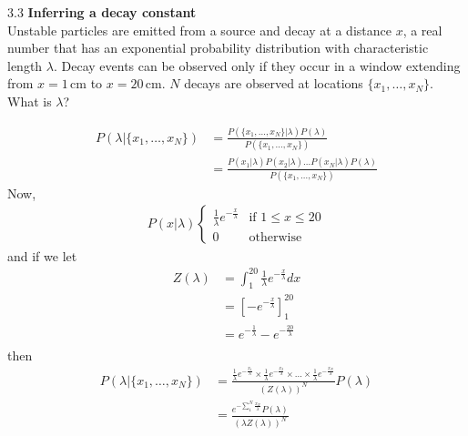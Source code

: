 \documentclass[12pt, a4paper]{article}
\begin{document}
\begin{prob}{3.3}
    \textbf{Inferring a decay constant} \\
Unstable particles are emitted from a source and decay at a distance $x$, a real number that has an exponential probability distribution with characteristic length $\lambda$. Decay events can be observed only if they occur in a window extending from $x = 1\,\text{cm}$ to $x = 20\,\text{cm}$. $N$ decays are observed at locations $\{x_1, \dots, x_N\}$. What is $\lambda$?
\end{prob}
\begin{sol}
    \begin{align*}
        P(\lambda | \{ x_1, \dots , x_N\}) &= \frac{P(\{ x_1, \dots , x_N\} | \lambda) P(\lambda)}{P(\{ x_1, \dots , x_N\})} \\
        &= \frac{P(x_1|\lambda)P(x_2|\lambda)\dots P(x_N|\lambda)P(\lambda)}{P(\{ x_1, \dots , x_N\})}
    \end{align*}
    Now, 
\begin{align*}
    P(x|\lambda)
\begin{cases} 
  \frac{1}{\lambda} e^{-\frac{x}{\lambda}} & \text{if } 1 \leq x \leq 20 \\
  0 & \text{otherwise}
\end{cases}
\end{align*}
and if we let 
\begin{align*}
    Z(\lambda) &= \int_{1}^{20} \frac{1}{\lambda} e^{-\frac{x}{\lambda}} dx \\
    &= \left[-e^{-\frac{x}{\lambda}} \right]_1^20 \\
    &= e^{-\frac{1}{\lambda}} - e^{-\frac{20}{\lambda}} \\
\end{align*}
then
\begin{align*}
    P(\lambda | \{ x_1, \dots , x_N\}) &= \frac{\frac{1}{\lambda} e ^{-\frac{x_1}{\lambda}} \times \frac{1}{\lambda} e ^{-\frac{x_2}{\lambda}} \times \dots \times \frac{1}{\lambda} e ^{-\frac{x_N}{\lambda}}}{(Z(\lambda))^N} P(\lambda) \\
    &= \frac{e^{-\sum_{1}^{N} \frac{x_N}{\lambda}}P(\lambda)}{(\lambda Z(\lambda))^N}
\end{align*}
\end{sol}
\bigskip
\end{document}
